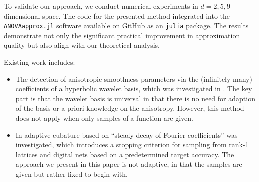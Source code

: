 \documentclass[a4paper]{scrartcl}
\numberwithin{equation}{section}
\begin{document}
To validate our approach, we conduct numerical experiments in $d=2,5,9$ dimensional space.
The code for the presented method integrated into the \texttt{ANOVAapprox.jl} software available on GitHub as an \texttt{julia} package.
The results demonstrate not only the significant practical improvement in approximation quality but also align with our theoretical analysis.

Existing work includes:
\begin{itemize}
\item
    The detection of anisotropic smoothness parameters via the (infinitely many) coefficients of a hyperbolic wavelet basis, which was investigated in \cite{SUV21}.
    The key part is that the wavelet basis is universal in that there is no need for adaption of the basis or a priori knowledge on the anisotropy.
    However, this method does not apply when only samples of a function are given.
\item
    In \cite{HJL18} adaptive cubature based on ``steady decay of Fourier coefficients'' was investigated, which introduces a stopping criterion for sampling from rank-1 lattices and digital nets based on a predetermined target accuracy.
    The approach we present in this paper is not adaptive, in that the samples are given but rather fixed to begin with.
\end{itemize}
\end{document}
